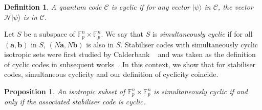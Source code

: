 \documentclass[conference]{IEEEtran}
\renewcommand{\=}{\approx}
\newcommand{\Va}{\mathbf{a}}
\newcommand{\Vb}{\mathbf{b}}
\newcommand{\N}{\mathcal{N}}
\newcommand{\ket}[1]{|#1\rangle}
\newcommand{\transpose}[1]{\ensuremath{#1^{\mathrm{T}}}}
\newtheorem{definition}[theorem]{Definition}
\newtheorem{proposition}[theorem]{Proposition}
\begin{document}
\begin{definition}\label{def_qcc} 
  A quantum code $\mathcal{C}$ is \emph{cyclic} if for any vector
  $\ket{\psi}$ in $\mathcal{C}$, the vector $\N \ket{\psi}$ is in
  $\mathcal{C}$.
\end{definition}

Let $S$ be a subspace of $\mathbb{F}_p^n \times \mathbb{F}_p^n$. We
say that $S$ is \emph{simultaneously cyclic} if for all $(\Va,\Vb)$ in
$S$, $(N\Va,N\Vb)$ is also in $S$. Stabiliser codes with simultaneously
cyclic isotropic sets were first studied by Calderbank
\etal~\cite[Section 5]{calderbank98quantum} and was taken as the
definition of cyclic codes in subsequent
works~\cite{thangaraj2001quantumcyclic,salah2006quantumBCH,ketkar2005nonbinary}. In
this context, we show that for stabiliser codes, simultaneous
cyclicity and our definition of cyclicity coincide.

\begin{proposition}\label{prop:stab-cyclic} 
  An isotropic subset of $\mathbb{F}_p^{n}\times\mathbb{F}_p^n$ is
  simultaneously cyclic if and only if the associated stabiliser code
  is cyclic.
\end{proposition} 
% 
%   
\end{document}
